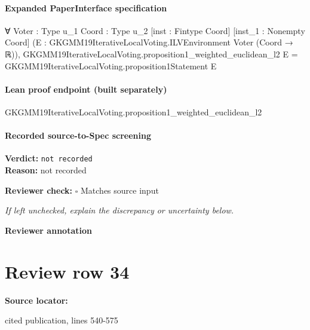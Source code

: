 \documentclass[10pt]{article}
\newcommand{\reviewerbox}{%
  \par\noindent\fbox{\parbox{0.96\linewidth}{\rule{0pt}{0.38in}}}\par
}
\newcommand{\reviewmatch}[1]{%
  \par\noindent\textbf{Reviewer check:} $\square$\; #1\par
  \noindent\emph{If left unchecked, explain the discrepancy or uncertainty below.}\par
}
\begin{document}
\paragraph{Expanded PaperInterface specification}
\begin{ReviewVerbatim}
∀ {Voter : Type u_1} {Coord : Type u_2} [inst : Fintype Coord] [inst_1 : Nonempty Coord]
  (E : GKGMM19IterativeLocalVoting.ILVEnvironment Voter (Coord → ℝ)),
  GKGMM19IterativeLocalVoting.proposition1_weighted_euclidean_l2 E = GKGMM19IterativeLocalVoting.proposition1Statement E
\end{ReviewVerbatim}

\paragraph{Lean proof endpoint (built separately)}\begin{ReviewVerbatim}
GKGMM19IterativeLocalVoting.proposition1_weighted_euclidean_l2
\end{ReviewVerbatim}

\paragraph{Recorded source-to-Spec screening}
\textbf{Verdict:} \texttt{not recorded}
\\
\textbf{Reason:} not recorded
\reviewmatch{Matches source input}
\noindent\textbf{Reviewer annotation}\par
\reviewerbox
\clearpage
\hypertarget{source-claim-732e45903404fd5e}{}
\section*{Review row 34}
\textbf{Source locator:} {\footnotesize\raggedright cited publication, lines 540-\allowbreak{}575\par}
\end{document}
